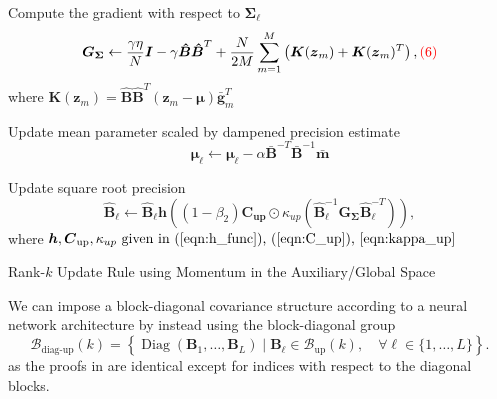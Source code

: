 \documentclass[a4paper, 11pt, oneside]{scrartcl}
\theoremstyle{break}
\DeclareMathOperator{\Diag}{Diag}
\newcommand{\matr}[1]{\boldsymbol{#1}}
\newcommand{\set}[1]{\mathcal{#1}}
\numberwithin{equation}{section}
\begin{document}
\begin{algorithm}[!htbp]
{{							Compute the gradient with respect to $\matr{\Sigma}_{\ell}$
							$$\matr{G_{\Sigma}} \leftarrow \frac{\gamma \eta}{N} \matr{I} - \gamma\matr{\hat{B}} \matr{\hat{B}}^T + \frac{N}{2M} \sum_{m=1}^M \left( \matr{K}(\matr{z}_m) + \matr{K}(\matr{z}_m)^T \right), \color{red} \text{(6)} \color{black}$$
							where $\matr{K}(\matr{z}_m) = \matr{\hat{B}} \matr{\hat{B}}^T (\matr{z}_m - \matr{\mu}) \matr{\bar{g}}_m^T$

							Update mean parameter scaled by dampened precision estimate
							$$\matr{\mu}_{\ell} \leftarrow \matr{\mu}_{\ell} - \alpha \matr{\bar{B}}^{-T} \matr{\bar{B}}^{-1} \matr{\bar{m}} $$

							Update square root precision
							$$\matr{\hat{B}}_{\ell} \leftarrow \matr{\hat{B}}_{\ell} \matr{h}((1 - \beta_2) \matr{C_{up}} \odot \kappa_{up}(\matr{\hat{B}}_{\ell}^{-1} \matr{G_{\Sigma}} \matr{\hat{B}}_{\ell}^{-T})),$$
							where $\matr{h}, \matr{C}_{\text{up}}, \kappa_{up} \text{ given in (\ref{eqn:h_func}), (\ref{eqn:C_up}), \ref{eqn:kappa_up}}$
						}
					}
					\caption{Rank-$k$ Update Rule using Momentum in the Auxiliary/Global Space}
					\label{alg:RC}
				\end{algorithm}

				We can impose a block-diagonal covariance structure according to a neural network architecture by instead using the block-diagonal group
				\begin{equation*}
					\set{B}_{\text{diag-up}}(k) = \left\{ \Diag(\matr{B}_1, \dots, \matr{B}_L) \mid \matr{B}_{\ell} \in \set{B}_{\text{up}} (k), \quad \forall \ell \in \{1, \dots, L\} \right\}.
				\end{equation*}
				as the proofs in \parencite{LNK+21} are identical except for indices with respect to the diagonal blocks. 
\end{document}

